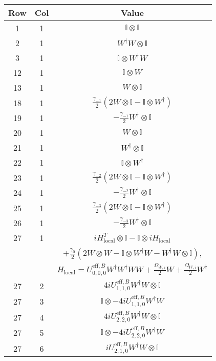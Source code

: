 \begin{longtable}{ccc}
	\hline
	Row & Col & Value \\
	\hline
	1 & 1 & \(\mathbb{I} \otimes \mathbb{I}\)  \\
	2 & 1 & \(W^{\dagger}W \otimes \mathbb{I}\)  \\
	3 & 1 & \(\mathbb{I} \otimes W^{\dagger}W\)  \\
	12 & 1 & \(\mathbb{I} \otimes W\)  \\
	13 & 1 & \(W \otimes \mathbb{I}\)  \\
	18 & 1 & \(\frac{\gamma_{-1}}{2}\left( 2W \otimes \mathbb{I} - \mathbb{I} \otimes W^{\dagger}\right)\)  \\
	19 & 1 & \(-\frac{\gamma_{-1}}{2}W^{\dagger} \otimes \mathbb{I}\)  \\
	20 & 1 & \(W \otimes \mathbb{I}\)  \\
	21 & 1 & \(W^{\dagger} \otimes \mathbb{I}\)  \\
	22 & 1 & \(\mathbb{I} \otimes W^{\dagger}\)  \\
	23 & 1 & \(\frac{\gamma_{-2}}{2}\left( 2W \otimes \mathbb{I} - \mathbb{I} \otimes W^{\dagger} \right)\)  \\
	24 & 1 & \(-\frac{\gamma_{-2}}{2}W^{\dagger} \otimes \mathbb{I}\)  \\
	25 & 1 & \(\frac{\gamma_{-3}}{2}\left( 2W \otimes \mathbb{I} - \mathbb{I} \otimes W^{\dagger} \right)\) \\
	26 & 1 & \(-\frac{\gamma_{-3}}{2}W^{\dagger} \otimes \mathbb{I} \)  \\
	\hline
	27 & 1 & \(iH_{\mathrm{local}}^{T} \otimes \mathbb{I} - \mathbb{I} \otimes iH_{\mathrm{local}}\) \\ 
	   &   & \(+ \frac{\gamma_{0}}{2}\left(2W \otimes W - \mathbb{I} \otimes W^{\dagger}W - W^{\dagger}W \otimes \mathbb{I}\right)\), \\
	   &   & \(H_{\mathrm{local}} = U^{\mathrm{eff},B}_{0,0,0}W^{\dagger}W^{\dagger}WW + \frac{\Omega_{W,i}}{2}W + \frac{\Omega_{W,i}}{2}W^{\dagger}\) \\  
	\hline
	27 & 2  & \(4iU^{\mathrm{eff},B}_{1,1,0}W^{\dagger}W \otimes \mathbb{I}\) \\
	27 & 3  & \(\mathbb{I} \otimes -4iU^{\mathrm{eff},B}_{1,1,0}W^{\dagger}W\) \\
	27 & 4  & \(4iU^{\mathrm{eff},B}_{2,2,0}W^{\dagger}W \otimes \mathbb{I}\) \\
	27 & 5  & \(\mathbb{I} \otimes -4iU^{\mathrm{eff},B}_{2,2,0}W^{\dagger}W\) \\
	27 & 6  & \(iU^{\mathrm{eff},B}_{2,1,0}W^{\dagger}W \otimes \mathbb{I}\) \\

\end{longtable}
